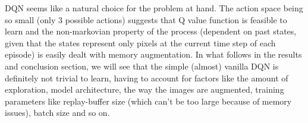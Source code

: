 \medskip
\noindent
DQN seems like a natural choice for the problem at hand. The action space being so small (only 3 possible actions) suggests that Q value function is feasible to learn and the non-markovian property of the process (dependent on past states, given that the states represent only pixels at the current time step of each episode) is easily dealt with memory augmentation. In what follows in the results and conclusion section, we will see that the simple (almost) vanilla DQN is definitely not trivial to learn, having to account for factors like the amount of exploration, model architecture, the way the images are augmented, training parameters like replay-buffer size (which can't be too large because of memory issues), batch size and so on.
